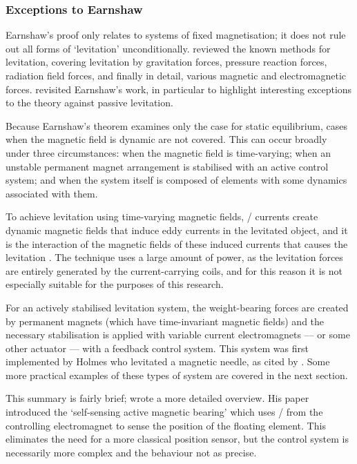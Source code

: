 \documentclass[11pt,a4paper]{memoir}
\begin{document}
\subsubsection{Exceptions to Earnshaw}

Earnshaw's proof only relates to systems of fixed magnetisation; it does not rule out all forms of `levitation' unconditionally.
\textcite{boerdijk1956a} reviewed the known methods for levitation, covering levitation by gravitation forces, pressure reaction forces, radiation field forces, and finally in detail, various magnetic and electromagnetic forces.
\textcite{bassani2006-meccanica} revisited Earnshaw's work, in particular to highlight interesting exceptions to the theory against passive levitation.

Because Earnshaw's theorem examines only the case for static equilibrium, cases when the magnetic field is dynamic are not covered.
This can occur broadly under three circumstances: when the magnetic field is time-varying; when an unstable permanent magnet arrangement is stabilised with an active control system; and when the system itself is composed of elements with some dynamics associated with them.

To achieve levitation using time-varying magnetic fields, \AC/ currents create dynamic magnetic fields that induce eddy currents in the levitated object, and it is the interaction of the magnetic fields of these induced currents that causes the levitation \cite{laithwaite1965}.
The technique uses a large amount of power, as the levitation forces are entirely generated by the current-carrying coils, and for this reason it is not especially suitable for the purposes of this research.

For an actively stabilised levitation system, the weight-bearing forces are created by permanent magnets (which have time-invariant magnetic fields) and the necessary stabilisation is applied with variable current electromagnets — or some other actuator — with a feedback control system.
This system was first implemented by Holmes who levitated a magnetic needle, as cited by \textcite{boerdijk1956a}.
Some more practical examples of these types of system are covered in the next section.

This summary is fairly brief; \textcite{bleuler1992} wrote a more detailed overview.
His paper introduced the `self-sensing active magnetic bearing' \cite{vischer1993} which uses \backemf/ from the controlling electromagnet to sense the position of the floating element.
This eliminates the need for a more classical position sensor,
but the control system is necessarily more complex and the behaviour not as precise.
\end{document}
